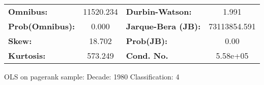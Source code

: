 \begin{center}
\begin{tabular}{lccccc}
\bottomrule
\end{tabular}
\begin{tabular}{lclc}
\textbf{Omnibus:}       & 11520.234 & \textbf{  Durbin-Watson:     } &      1.991    \\
\textbf{Prob(Omnibus):} &    0.000  & \textbf{  Jarque-Bera (JB):  } & 73113854.591  \\
\textbf{Skew:}          &   18.702  & \textbf{  Prob(JB):          } &       0.00    \\
\textbf{Kurtosis:}      &  573.249  & \textbf{  Cond. No.          } &   5.58e+05    \\
\bottomrule
\end{tabular}
\end{center}
\break
OLS on pagerank sample: Decade: 1980 Classification: 4

